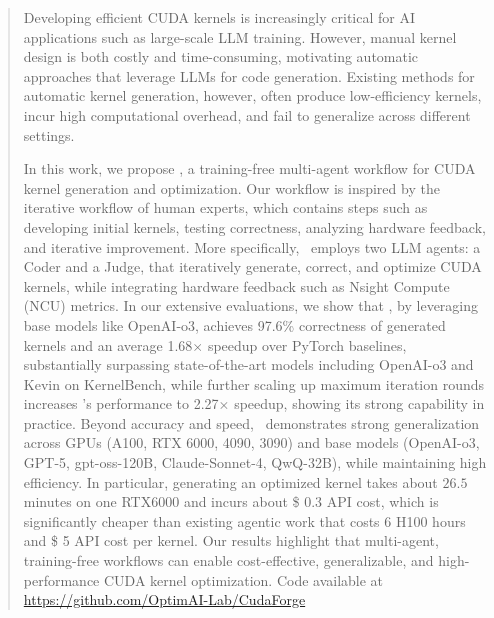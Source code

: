 \begin{abstract}
Developing efficient CUDA kernels is increasingly critical for AI applications such as large-scale LLM training. However, manual kernel design is both costly and time-consuming, motivating automatic approaches that leverage LLMs for code generation. Existing methods for automatic kernel generation, however, often produce low-efficiency kernels, incur high computational overhead, and fail to generalize across different settings. 

In this work, we propose \agentname, a training-free multi-agent workflow for CUDA kernel generation and optimization. Our workflow is inspired by the iterative workflow of human experts, which contains steps such as developing initial kernels, testing correctness, analyzing hardware feedback, and iterative improvement.
More specifically, \agentname~employs two LLM agents: a Coder and a Judge, that iteratively generate, correct, and optimize CUDA kernels, while integrating hardware feedback such as Nsight Compute (NCU) metrics. In our extensive evaluations, we show that \agentname, by leveraging base models like OpenAI-o3, achieves 97.6\% correctness of generated kernels and an average 1.68$\times$ speedup over PyTorch baselines, substantially surpassing state-of-the-art models including OpenAI-o3 and Kevin on KernelBench, while further scaling up maximum iteration rounds increases \agentname's performance to 2.27$\times$ speedup, showing its strong capability in practice. Beyond accuracy and speed, \agentname~demonstrates strong generalization across GPUs (A100, RTX 6000, 4090, 3090) and base models (OpenAI-o3, GPT-5, gpt-oss-120B, Claude-Sonnet-4, QwQ-32B), while maintaining high efficiency. In particular, generating an optimized kernel takes about $26.5$ minutes on one RTX6000 and incurs about \$ 0.3 API cost, which is significantly cheaper than existing agentic work that costs 6 H100 hours and \$ 5 API cost per kernel.  Our results highlight that multi-agent, training-free workflows can enable cost-effective, generalizable, and high-performance CUDA kernel optimization. Code available at \url{https://github.com/OptimAI-Lab/CudaForge}
\end{abstract}